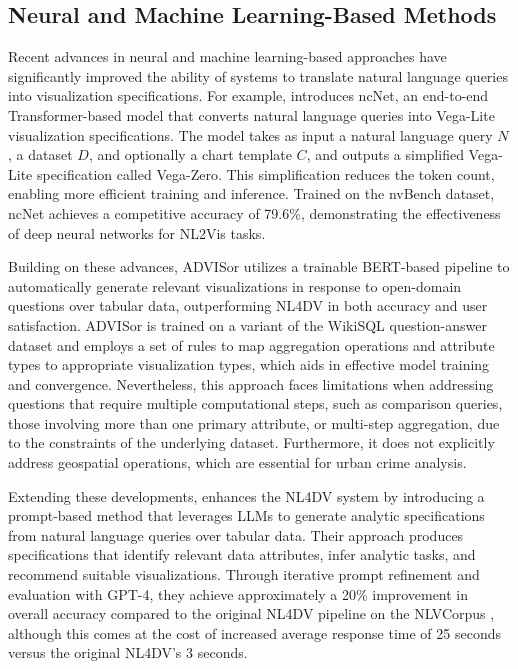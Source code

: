 \subsection{Neural and Machine Learning-Based Methods}

Recent advances in neural and machine learning-based approaches have significantly improved the ability of systems to translate natural language queries into visualization specifications. For example, \cite{Luo2022NL2Vis} introduces ncNet, an end-to-end Transformer-based model that converts natural language queries into Vega-Lite visualization specifications. The model takes as input a natural language query $N$, a dataset $D$, and optionally a chart template $C$, and outputs a simplified Vega-Lite specification called Vega-Zero. This simplification reduces the token count, enabling more efficient training and inference. Trained on the nvBench dataset, ncNet achieves a competitive accuracy of 79.6\%, demonstrating the effectiveness of deep neural networks for NL2Vis tasks.

Building on these advances, ADVISor \cite{Liu2021ADVISor} utilizes a trainable BERT-based \cite{bertPaper} pipeline to automatically generate relevant visualizations in response to open-domain questions over tabular data, outperforming NL4DV \cite{Narechania2021NL4DV} in both accuracy and user satisfaction. ADVISor is trained on a variant of the WikiSQL \cite{Zhong2017WikiSQL} question-answer dataset and employs a set of rules to map aggregation operations and attribute types to appropriate visualization types, which aids in effective model training and convergence. Nevertheless, this approach faces limitations when addressing questions that require multiple computational steps, such as comparison queries, those involving more than one primary attribute, or multi-step aggregation, due to the constraints of the underlying dataset. Furthermore, it does not explicitly address geospatial operations, which are essential for urban crime analysis.

Extending these developments, \cite{Sah2024GeneratingAnalyticsDataVizLLMs} enhances the NL4DV system \cite{Narechania2021NL4DV} by introducing a prompt-based method that leverages LLMs to generate analytic specifications from natural language queries over tabular data. Their approach produces specifications that identify relevant data attributes, infer analytic tasks, and recommend suitable visualizations. Through iterative prompt refinement and evaluation with GPT-4, they achieve approximately a 20\% improvement in overall accuracy compared to the original NL4DV pipeline on the NLVCorpus \cite{Srinivasan2021NLVCorpus}, although this comes at the cost of increased average response time of 25 seconds versus the original NL4DV’s 3 seconds.

